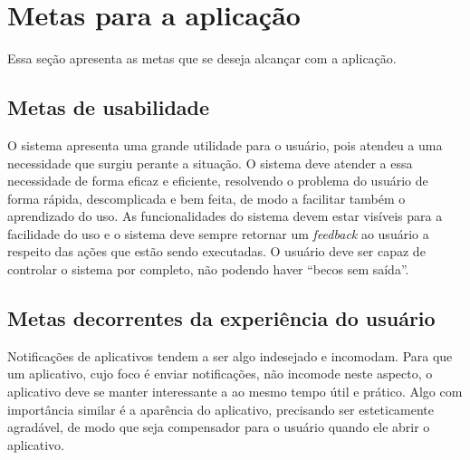 \chapter{Metas para a aplicação}
  
  Essa seção apresenta as metas que se deseja alcançar com a aplicação.

  \section{Metas de usabilidade}
  
    O sistema apresenta uma grande utilidade para o usuário, pois atendeu a uma necessidade que surgiu perante a situação. 
    O sistema deve atender a essa necessidade de forma eficaz e eficiente, resolvendo o problema do usuário de forma rápida,
    descomplicada e bem feita, de modo a facilitar também o aprendizado do uso. As funcionalidades do sistema devem estar visíveis 
    para a facilidade do uso e o sistema deve sempre retornar um \textit{feedback} ao usuário a respeito das ações que estão sendo executadas.
    O usuário deve ser capaz de controlar o sistema por completo, não podendo haver “becos sem saída”.

  \section{Metas decorrentes da experiência do usuário}

    Notificações de aplicativos tendem a ser algo indesejado e incomodam. Para que um aplicativo, cujo foco é enviar notificações,
    não incomode neste aspecto, o aplicativo deve se manter interessante a ao mesmo tempo útil e prático. Algo com importância similar
    é a aparência do aplicativo, precisando ser esteticamente agradável, de modo que seja compensador para o usuário quando ele abrir 
    o aplicativo. 
